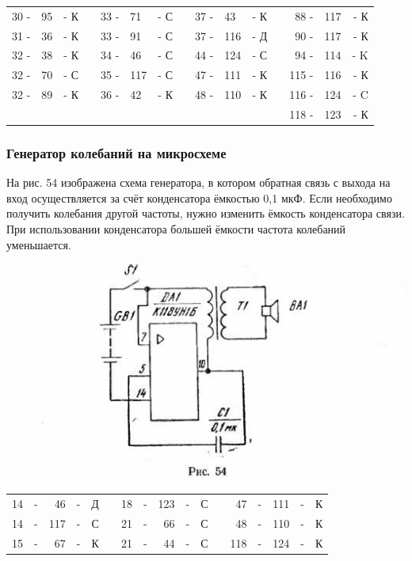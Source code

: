 \documentclass[12pt]{article}
\begin{document}
\begin{tabular}{r l r p{0.5cm} r l r p{0.5cm} r l r p{0.5cm} r l r}
30 - &  95 & - К &   & 33 - & 71 & - С &   & 37 - &  43 & - К &   &  88 - & 117  & - К\\
31 - &  36 & - К &   & 33 - & 91 & - С &   & 37 - & 116 & - Д &   &  90 - & 117  & - К\\
32 - &  38 & - К &   & 34 - & 46 & - С &   & 44 - & 124 & - С &   &  94 - & 114  & - K\\
32 - &  70 & - С &   & 35 - &117 & - С &   & 47 - & 111 & - К &   & 115 - & 116  & - К\\
32 - &  89 & - К &   & 36 - & 42 & - К &   & 48 - & 110 & - К &   & 116 - & 124  & - C\\
     &     &     &   &      &    &     &   &      &     &     &   & 118 - & 123  & - К\\
\end{tabular}

\hrulefill

\subsubsection{Генератор колебаний на микросхеме}

На рис. 54 изображена схема генератора, в котором обратная связь с выхода на вход осуществляется за счёт конденсатора ёмкостью 0,1 мкФ. Если необходимо получить колебания другой частоты, нужно изменить ёмкость конденсатора связи. При использовании конденсатора большей ёмкости частота колебаний уменьшается.

\newpage

\includegraphics[scale=1, angle=0]{ekon3_054_1}

\hrulefill

\begin{tabular}{r c r c r p{2cm} r c r c r p{2cm} r c r c r}
 14 & - &  46 & - & Д &     &  18 & - & 123 & - & С &    &  47 & - & 111 & - & К\\
 14 & - & 117 & - & С &     &  21 & - &  66 & - & С &    &  48 & - & 110 & - & К\\
 15 & - &  67 & - & К &     &  21 & - &  44 & - & С &    & 118 & - & 124 & - & К\\
\end{tabular}
\end{document}
